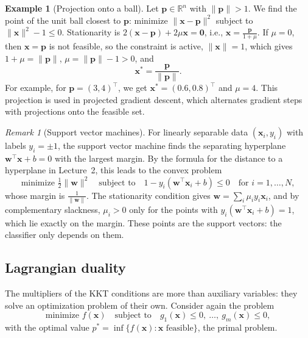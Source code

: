 \documentclass[11pt]{article}
\newcommand{\norm}[1]{\lVert #1 \rVert}
\theoremstyle{definition}
\newtheorem{example}[definition]{Example}
\theoremstyle{plain}
\theoremstyle{remark}
\newtheorem{remark}[definition]{Remark}
\begin{document}
\begin{example}[Projection onto a ball]\label{ex:kkt-ball}
    Let $\mathbf{p} \in \mathbb{R}^n$ with $\norm{\mathbf{p}} > 1$. We find the point of the unit ball closest to $\mathbf{p}$: minimize $\norm{\mathbf{x} - \mathbf{p}}^2$ subject to $\norm{\mathbf{x}}^2 - 1 \leq 0$. Stationarity is $2(\mathbf{x} - \mathbf{p}) + 2\mu\mathbf{x} = \mathbf{0}$, i.e., $\mathbf{x} = \frac{\mathbf{p}}{1 + \mu}$. If $\mu = 0$, then $\mathbf{x} = \mathbf{p}$ is not feasible, so the constraint is active, $\norm{\mathbf{x}} = 1$, which gives $1 + \mu = \norm{\mathbf{p}}$, $\mu = \norm{\mathbf{p}} - 1 > 0$, and
    \[\mathbf{x}^* = \frac{\mathbf{p}}{\norm{\mathbf{p}}}.\]
    For example, for $\mathbf{p} = (3, 4)^\top$, we get $\mathbf{x}^* = (0.6, 0.8)^\top$ and $\mu = 4$. This projection is used in projected gradient descent, which alternates gradient steps with projections onto the feasible set.
\end{example}

\begin{remark}[Support vector machines]
    For linearly separable data $(\mathbf{x}_i, y_i)$ with labels $y_i = \pm 1$, the support vector machine finds the separating hyperplane $\mathbf{w}^\top\mathbf{x} + b = 0$ with the largest margin. By the formula for the distance to a hyperplane in Lecture~2, this leads to the convex problem
    \[\text{minimize } \tfrac{1}{2}\norm{\mathbf{w}}^2 \quad \text{subject to} \quad 1 - y_i(\mathbf{w}^\top\mathbf{x}_i + b) \leq 0 \quad \text{for } i = 1, \ldots, N,\]
    whose margin is $\frac{1}{\norm{\mathbf{w}}}$. The stationarity condition gives $\mathbf{w} = \sum_i \mu_i y_i\mathbf{x}_i$, and by complementary slackness, $\mu_i > 0$ only for the points with $y_i(\mathbf{w}^\top\mathbf{x}_i + b) = 1$, which lie exactly on the margin. These points are the support vectors: the classifier only depends on them.
\end{remark}

\subsection{Lagrangian duality}\label{sec:duality}

The multipliers of the KKT conditions are more than auxiliary variables: they solve an optimization problem of their own. Consider again the problem
\[\text{minimize } f(\mathbf{x}) \quad \text{subject to} \quad g_1(\mathbf{x}) \leq 0, \ \ldots, \ g_m(\mathbf{x}) \leq 0,\]
with the optimal value $p^* = \inf\{f(\mathbf{x}) : \mathbf{x} \text{ feasible}\}$, the primal problem.
\end{document}
